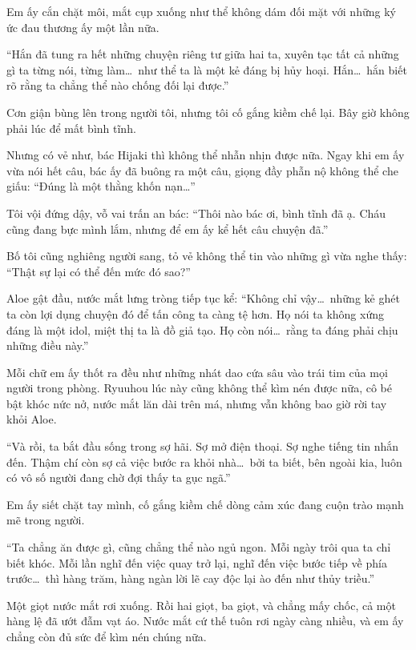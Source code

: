 \documentclass[../main.tex]{subfiles}
\begin{document}
Em ấy cắn chặt môi, mắt cụp xuống như thể không dám đối mặt với những ký ức đau thương ấy một lần nữa.

``Hắn đã tung ra hết những chuyện riêng tư giữa hai ta, xuyên tạc tất cả những gì ta từng nói, từng làm\dots\ như thể ta là một kẻ đáng bị hủy hoại. Hắn\dots\ hắn biết rõ rằng ta chẳng thể nào chống đối lại được.''

Cơn giận bùng lên trong người tôi, nhưng tôi cố gắng kiềm chế lại. Bây giờ không phải lúc để mất bình tĩnh.

Nhưng có vẻ như, bác Hijaki thì không thể nhẫn nhịn được nữa. Ngay khi em ấy vừa nói hết câu, bác ấy đã buông ra một câu, giọng đầy phẫn nộ không thể che giấu: ``Đúng là một thằng khốn nạn\dots''

Tôi vội đứng dậy, vỗ vai trấn an bác: ``Thôi nào bác ơi, bình tĩnh đã ạ. Cháu cũng đang bực mình lắm, nhưng để em ấy kể hết câu chuyện đã.''

Bố tôi cũng nghiêng người sang, tỏ vẻ không thể tin vào những gì vừa nghe thấy: ``Thật sự lại có thể đến mức đó sao?''

Aloe gật đầu, nước mắt lưng tròng tiếp tục kể: ``Không chỉ vậy\dots\ những kẻ ghét ta còn lợi dụng chuyện đó để tấn công ta càng tệ hơn. Họ nói ta không xứng đáng là một idol, miệt thị ta là đồ giả tạo. Họ còn nói\dots\ rằng ta đáng phải chịu những điều này.''

Mỗi chữ em ấy thốt ra đều như những nhát dao cứa sâu vào trái tim của mọi người trong phòng. Ryuuhou lúc này cũng không thể kìm nén được nữa, cô bé bật khóc nức nở, nước mắt lăn dài trên má, nhưng vẫn không bao giờ rời tay khỏi Aloe.

``Và rồi, ta bắt đầu sống trong sợ hãi. Sợ mở điện thoại. Sợ nghe tiếng tin nhắn đến. Thậm chí còn sợ cả việc bước ra khỏi nhà\dots\ bởi ta biết, bên ngoài kia, luôn có vô số người đang chờ đợi thấy ta gục ngã.''

Em ấy siết chặt tay mình, cố gắng kiềm chế dòng cảm xúc đang cuộn trào mạnh mẽ trong người.

``Ta chẳng ăn được gì, cũng chẳng thể nào ngủ ngon. Mỗi ngày trôi qua ta chỉ biết khóc. Mỗi lần nghĩ đến việc quay trở lại, nghĩ đến việc bước tiếp về phía trước\dots\ thì hàng trăm, hàng ngàn lời lẽ cay độc lại ào đến như thủy triều.''

Một giọt nước mắt rơi xuống. Rồi hai giọt, ba giọt, và chẳng mấy chốc, cả một hàng lệ đã ướt đẫm vạt áo. Nước mắt cứ thế tuôn rơi ngày càng nhiều, và em ấy chẳng còn đủ sức để kìm nén chúng nữa.
\end{document}
